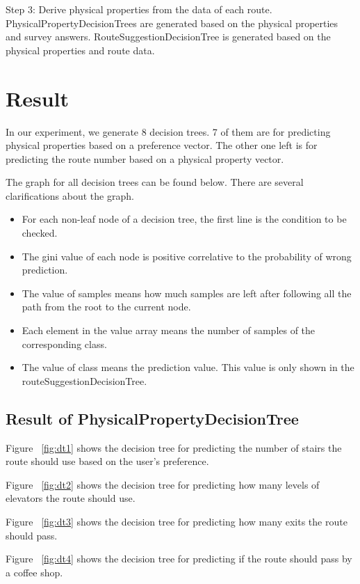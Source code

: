 \documentclass{sigchi}
\begin{document}
Step 3: Derive physical properties from the data of each route. PhysicalPropertyDecisionTrees are generated based on the physical properties and survey answers. RouteSuggestionDecisionTree is generated based on the physical properties and route data.

\section{Result}

In our experiment, we generate 8 decision trees. 7 of them are for predicting physical properties based on a preference vector. The other one left is for predicting the route number based on a physical property vector.


The graph for all decision trees can be found below. There are several clarifications about the graph.
\begin{itemize}
\item For each non-leaf node of a decision tree, the first line is the condition to be checked. 
\item The gini value of each node is positive correlative to the probability of wrong prediction. 
\item The value of samples means how much samples are left after following all the path from the root to the current node.
\item Each element in the value array means the number of samples of the corresponding class.
\item The value of class means the prediction value. This value is only shown in the routeSuggestionDecisionTree.
\end{itemize}

\subsection{Result of PhysicalPropertyDecisionTree}

Figure ~\ref{fig:dt1} shows the decision tree for predicting the number of stairs the route should use based on the user’s preference.


Figure ~\ref{fig:dt2} shows the decision tree for predicting how many levels of elevators the route should use.


Figure ~\ref{fig:dt3} shows the decision tree for predicting how many exits the route should pass.


Figure ~\ref{fig:dt4} shows the decision tree for predicting if the route should pass by a coffee shop.
\end{document}
